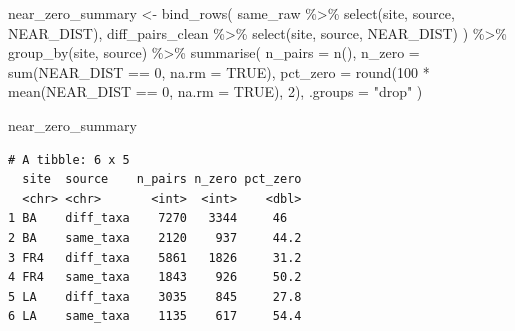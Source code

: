 \documentclass[
  letterpaper,
  DIV=11,
  numbers=noendperiod]{scrartcl}
\newenvironment{Shaded}{\begin{snugshade}}{\end{snugshade}}
\newcommand{\AttributeTok}[1]{\textcolor[rgb]{0.40,0.45,0.13}{#1}}
\newcommand{\ConstantTok}[1]{\textcolor[rgb]{0.56,0.35,0.01}{#1}}
\newcommand{\DecValTok}[1]{\textcolor[rgb]{0.68,0.00,0.00}{#1}}
\newcommand{\FunctionTok}[1]{\textcolor[rgb]{0.28,0.35,0.67}{#1}}
\newcommand{\NormalTok}[1]{\textcolor[rgb]{0.00,0.23,0.31}{#1}}
\newcommand{\OtherTok}[1]{\textcolor[rgb]{0.00,0.23,0.31}{#1}}
\newcommand{\SpecialCharTok}[1]{\textcolor[rgb]{0.37,0.37,0.37}{#1}}
\newcommand{\StringTok}[1]{\textcolor[rgb]{0.13,0.47,0.30}{#1}}
\begin{document}
\begin{Shaded}
\begin{Highlighting}[]
\NormalTok{near\_zero\_summary }\OtherTok{\textless{}{-}} \FunctionTok{bind\_rows}\NormalTok{(}
\NormalTok{  same\_raw }\SpecialCharTok{\%\textgreater{}\%} \FunctionTok{select}\NormalTok{(site, source, NEAR\_DIST),}
\NormalTok{  diff\_pairs\_clean }\SpecialCharTok{\%\textgreater{}\%} \FunctionTok{select}\NormalTok{(site, source, NEAR\_DIST)}
\NormalTok{) }\SpecialCharTok{\%\textgreater{}\%}
  \FunctionTok{group\_by}\NormalTok{(site, source) }\SpecialCharTok{\%\textgreater{}\%}
  \FunctionTok{summarise}\NormalTok{(}
    \AttributeTok{n\_pairs =} \FunctionTok{n}\NormalTok{(),}
    \AttributeTok{n\_zero =} \FunctionTok{sum}\NormalTok{(NEAR\_DIST }\SpecialCharTok{==} \DecValTok{0}\NormalTok{, }\AttributeTok{na.rm =} \ConstantTok{TRUE}\NormalTok{),}
    \AttributeTok{pct\_zero =} \FunctionTok{round}\NormalTok{(}\DecValTok{100} \SpecialCharTok{*} \FunctionTok{mean}\NormalTok{(NEAR\_DIST }\SpecialCharTok{==} \DecValTok{0}\NormalTok{, }\AttributeTok{na.rm =} \ConstantTok{TRUE}\NormalTok{), }\DecValTok{2}\NormalTok{),}
    \AttributeTok{.groups =} \StringTok{"drop"}
\NormalTok{  )}

\NormalTok{near\_zero\_summary}
\end{Highlighting}
\end{Shaded}

\begin{verbatim}
# A tibble: 6 x 5
  site  source    n_pairs n_zero pct_zero
  <chr> <chr>       <int>  <int>    <dbl>
1 BA    diff_taxa    7270   3344     46  
2 BA    same_taxa    2120    937     44.2
3 FR4   diff_taxa    5861   1826     31.2
4 FR4   same_taxa    1843    926     50.2
5 LA    diff_taxa    3035    845     27.8
6 LA    same_taxa    1135    617     54.4
\end{verbatim}
\end{document}
